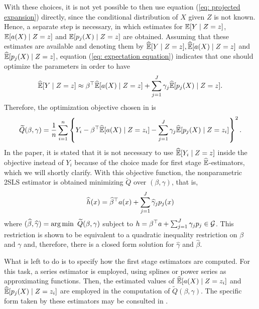 With these choices, it is not yet possible to then use equation (\ref{eq: projected expansion}) directly, since the conditional distribution of $ X $ given $ Z $ is not known.
Hence, a separate step is necessary, in which estimates for $ \mathbb{E} [ Y \mid Z = z ] $, $ \mathbb{E} [ a ( X ) \mid Z = z ] $ and $ \mathbb{E} [ p_{ j } ( X ) \mid Z = z ] $ are obtained.
Assuming that these estimates are available and denoting them by $ \widehat{ \mathbb{E} } [ Y \mid Z = z ], \widehat{ \mathbb{E} } [ a ( X ) \mid Z = z ] $ and $ \widehat{ \mathbb{E} } [ p_{ j } ( X ) \mid Z = z ] $, equation (\ref{eq: expectation equation}) indicates that one should optimize the parameters in order to have
\begin{equation*}
    \widehat{ \mathbb{E} } [ Y \mid Z = z ] \approx \beta^{ \top } \widehat{ \mathbb{E} } [ a ( X ) \mid Z = z ] + \sum_{ j=1 }^{ J } \gamma_{ j } \widehat{ \mathbb{E} } [ p_{ j } ( X ) \mid Z = z ]
.\end{equation*}
Therefore, the optimization objective chosen in \cite{newey2003} is
\begin{equation}
    \label{eq: newey loss}
    \widetilde{Q} ( \beta, \gamma )
    = \frac{ 1 }{ n } \sum_{ i=1 }^{ n } \left\{ Y_{ i } - \beta^{ \top } \widehat{ \mathbb{E} } [ a ( X ) \mid Z = z_{ i } ] - \sum_{ j=1 }^{ J } \gamma_{ j } \widehat{ \mathbb{E} } [ p_{ j } ( X ) \mid Z = z_{ i } ] \right\}^2
.\end{equation}
In the paper, it is stated that it is not necessary to use $ \widehat{ \mathbb{E} } [ Y_{ i } \mid Z = z ] $ inside the objective instead of $ Y_{ i } $ because of the choice made for first stage $ \widehat{ \mathbb{E} } $-estimators, which we will shortly clarify.
With this objective function, the nonparametric 2SLS estimator is obtained minimizing $ \widetilde{Q} $ over $ ( \beta, \gamma ) $, that is,
\begin{equation}
    \label{eq: newey optimization problem}
    \widehat{ h } ( x ) = \widehat{ \beta }^{ \top } a ( x ) + \sum_{ j=1 }^{ J } \widehat{ \gamma }_{ j } p_{ j } ( x )
\end{equation}
where $ ( \hat{ \beta }, \hat{ \gamma } ) = \argmin \widetilde{Q} ( \beta, \gamma ) $ subject to $ h = \beta^{ \top } a + \sum_{ j=1 }^{ J } \gamma_{ j } p_{ j } \in \mathcal{G} $.
This restriction is shown to be equivalent to a quadratic inequality restriction on $ \beta $ and $ \gamma $ and, therefore, there is a closed form solution for $ \hat{ \gamma } $ and $ \hat{ \beta } $.

What is left to do is to specify how the first stage estimators are computed.
For this task, a series estimator is employed, using splines or power series as approximating functions.
Then, the estimated values of $ \widehat { \mathbb{E} } [ a ( X ) \mid Z = z_{ i } ] $ and $ \widehat{ \mathbb{E} } [ p_{ j } ( X ) \mid Z = z_{ i } ] $ are employed in the computation of $ \widetilde{Q} ( \beta, \gamma ) $.
The specific form taken by these estimators may be consulted in \cite{newey2003}.

